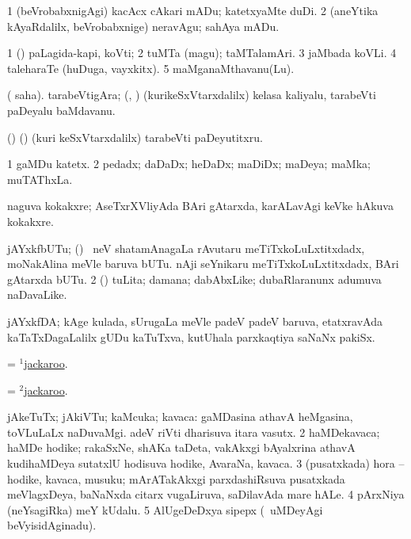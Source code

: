 \bentry
{}
\gl{\akirx}
\bmng
\bnum
\num{1} (beVrobabxnigAgi) kacAcx cAkari mADu; katetxyaMte duDi. 
\num{2} (aneYtika kAyaRdalilx, beVrobabxnige) neravAgu; sahAya mADu. 
\enum
\emng
\eentry

\bentry
{}
\gl{\nA}
\bmng
\bnum
\num{1} (\pArxparx) paLagida-kapi, koVti; 
\num{2} tuMTa (magu); taMTalamAri. 
\num{3} jaMbada koVLi. 
\num{4} taleharaTe (huDuga, vayxkitx). 
\num{5} maMganaMthavanu(Lu). 
\enum
\emng
\eentry

\bentry
{}
\gl{\nA}
\bmng
( saha). tarabeVtigAra; (\AseTxrXV, \AmA) (kurikeSxVtarxdalilx) kelasa kaliyalu, tarabeVti paDeyalu baMdavanu. 
\emng
\eentry

\bentry
{}
\gl{\akirx}
\bmng
(\AseTxrXV) (\AmA) (kuri keSxVtarxdalilx) tarabeVti paDeyutitxru. 
\emng
\eentry

\bentry
{}
\gl{\nA}
\bmng
\bnum
\num{1} gaMDu katetx. 
\num{2} pedadx; daDaDx; heDaDx; maDiDx; maDeya; maMka; muTAThxLa. 
\enum
\emng

\noindent
\gl{\pagu}
\bmng
{} 
 naguva kokakxre; AseTxrXVliyAda BAri gAtarxda, karALavAgi keVke hAkuva kokakxre. 
\emng
\eentry

\bentry
{}
\gl{\nA}
\bmng
\bnum
{} jAYxkfbUTu; 
\banum
{} (\birx) \kanmu\ neV shatamAnagaLa rAvutaru meTiTxkoLuLxtitxdadx, moNakAlina meVle baruva bUTu.  
 nAji seYnikaru meTiTxkoLuLxtitxdadx, BAri gAtarxda bUTu. 
\eanum
\numie
\num{2} (\rUpa) tuLita; damana; dabAbxLike; dubaRlaranunx adumuva naDavaLike. 
\enum
\emng
\eentry

\bentry
{}
\gl{\nA}
\bmng
jAYxkfDA; kAge kulada, sUrugaLa meVle padeV padeV baruva, etatxravAda kaTaTxDagaLalilx gUDu kaTuTxva, kutUhala parxkaqtiya saNaNx pakiSx. 
\emng
\eentry

\bentry
{}
\gl{\nA}
\bmng
=  \hyperlink{jackaroo(1)}{$^1$jackaroo}. 
\emng
\eentry

\bentry
{}
\gl{\akirx}
\bmng
=  \hyperlink{jackaroo(2)}{$^2$jackaroo}. 
\emng
\eentry

\bentry
{}
\gl{\nA}
\bmng
\bnum
{} jAkeTuTx; jAkiVTu; kaMcuka; kavaca: 
\banum
{} gaMDasina athavA heMgasina, toVLuLaLx naDuvaMgi. 
 adeV riVti dharisuva itara vasutx. 
\eanum
\numie
\num{2} haMDekavaca; haMDe hodike; rakaSxNe, shAKa taDeta, \mo vakAkxgi bAyalxrina athavA kudihaMDeya sutatxlU hodisuva hodike, AvaraNa, kavaca. 
\num{3} (pusatxkada) hora -- hodike, kavaca, musuku; mArATakAkxgi parxdashiRsuva pusatxkada meVlagxDeya, baNaNxda citarx \mo vugaLiruva, saDilavAda mare hALe. 
\num{4} pArxNiya (neYsagiRka) meY kUdalu. 
\num{5} AlUgeDeDxya sipepx (\kanmu\ uMDeyAgi beVyisidAginadu). 
\enum
\emng

